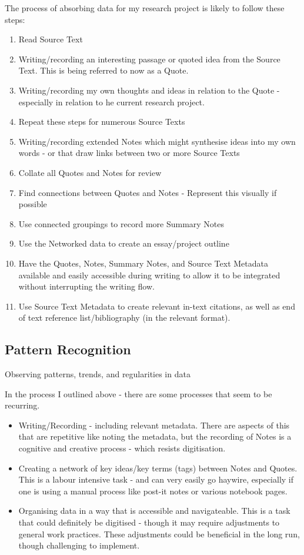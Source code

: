 \documentclass{article}
\begin{document}
The process of absorbing data for my research project is likely to follow these steps:
\begin{enumerate}
    \item Read Source Text
    \item Writing/recording an interesting passage or quoted idea from the Source Text. This is being referred to now as a Quote.
    \item Writing/recording my own thoughts and ideas in relation to the Quote - especially in relation to he current research project.
    \item Repeat these steps for numerous Source Texts
    \item Writing/recording extended Notes which might synthesise ideas into my own words - or that draw links between two or more Source Texts
    \item Collate all Quotes and Notes for review
    \item Find connections between Quotes and Notes - Represent this visually if possible
    \item Use connected groupings to record more Summary Notes
    \item Use the Networked data to create an essay/project outline
    \item Have the Quotes, Notes, Summary Notes, and Source Text Metadata available and easily accessible during writing to allow it to be integrated without interrupting the writing flow. 
    \item Use Source Text Metadata to create relevant in-text citations, as well as end of text reference list/bibliography (in the relevant format).
\end{enumerate}

\subsection{Pattern Recognition}
Observing patterns, trends, and regularities in data

In the process I outlined above - there are some processes that seem to be recurring. 

\begin{itemize}
    \item Writing/Recording - including relevant metadata. There are aspects of this that are repetitive like noting the metadata, but the recording of Notes is a cognitive and creative process - which resists digitisation. 
    \item Creating a network of key ideas/key terms (tags) between Notes and Quotes. This is a labour intensive task - and can very easily go haywire, especially if one is using a manual process like post-it notes or various notebook pages. 
    \item Organising data in a way that is accessible and navigateable. This is a task that could definitely be digitised - though it may require adjustments to general work practices. These adjustments could be beneficial in the long run, though challenging to implement.
\end{itemize}
\end{document}
